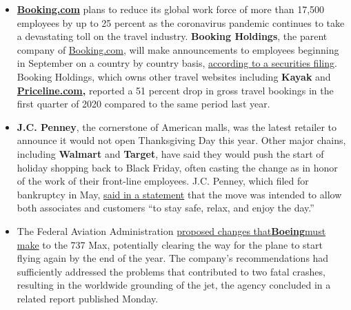 \begin{itemize}
\item
  \textbf{\href{http://booking.com/}{Booking.com}} plans to reduce its
  global work force of more than 17,500 employees by up to 25 percent as
  the coronavirus pandemic continues to take a devastating toll on the
  travel industry. \textbf{Booking Holdings}, the parent company of
  \href{http://booking.com/}{Booking.com}, will make announcements to
  employees beginning in September on a country by country basis,
  \href{https://www.sec.gov/ix?doc=/Archives/edgar/data/1075531/000107553120000042/bkng-20200804.htm}{according
  to a securities filing}. Booking Holdings, which owns other travel
  websites including \textbf{Kayak} and
  \textbf{\href{http://priceline.com/}{Priceline.com},} reported a 51
  percent drop in gross travel bookings in the first quarter of 2020
  compared to the same period last year.
\item
  \textbf{J.C. Penney}, the cornerstone of American malls, was the
  latest retailer to announce it would not open Thanksgiving Day this
  year. Other major chains, including \textbf{Walmart} and
  \textbf{Target}, have said they would push the start of holiday
  shopping back to Black Friday, often casting the change as in honor of
  the work of their front-line employees. J.C. Penney, which filed for
  bankruptcy in May,
  \href{https://companyblog.jcpnewsroom.com/2020/08/03/jcpenney-to-close-stores-on-thanksgiving-day-2020/}{said
  in a statement} that the move was intended to allow both associates
  and customers ``to stay safe, relax, and enjoy the day.''
\item
  The Federal Aviation Administration
  \href{https://www.nytimes.com/live/2020/08/03/business/stock-market-today-coronavirus/faa-says-boeing-has-effectively-mitigated-defects-in-the-737-max}{proposed
  changes
  that}\textbf{\href{https://www.nytimes.com/live/2020/08/03/business/stock-market-today-coronavirus/faa-says-boeing-has-effectively-mitigated-defects-in-the-737-max}{Boeing}}\href{https://www.nytimes.com/live/2020/08/03/business/stock-market-today-coronavirus/faa-says-boeing-has-effectively-mitigated-defects-in-the-737-max}{must
  make} to the 737 Max, potentially clearing the way for the plane to
  start flying again by the end of the year. The company's
  recommendations had sufficiently addressed the problems that
  contributed to two fatal crashes, resulting in the worldwide grounding
  of the jet, the agency concluded in a related report published Monday.
\end{itemize}

